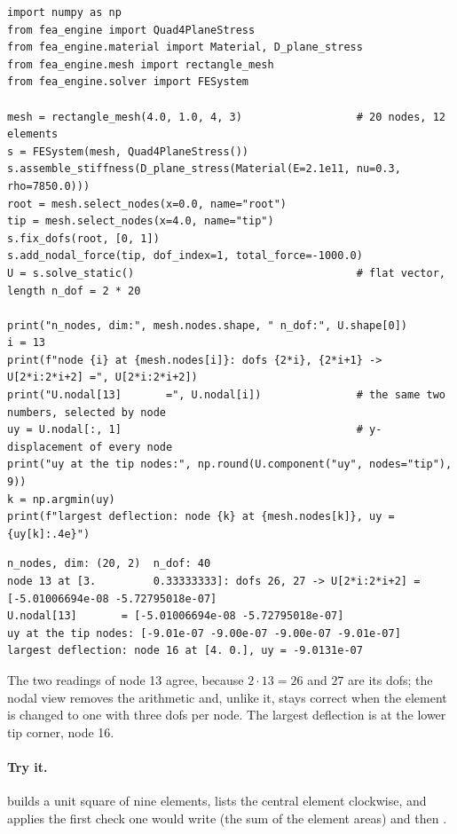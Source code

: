 \begin{lstlisting}[caption={Reading a solution per node (run with the package on the path).},label={lst:me-nodal}]
import numpy as np
from fea_engine import Quad4PlaneStress
from fea_engine.material import Material, D_plane_stress
from fea_engine.mesh import rectangle_mesh
from fea_engine.solver import FESystem

mesh = rectangle_mesh(4.0, 1.0, 4, 3)                  # 20 nodes, 12 elements
s = FESystem(mesh, Quad4PlaneStress())
s.assemble_stiffness(D_plane_stress(Material(E=2.1e11, nu=0.3, rho=7850.0)))
root = mesh.select_nodes(x=0.0, name="root")
tip = mesh.select_nodes(x=4.0, name="tip")
s.fix_dofs(root, [0, 1])
s.add_nodal_force(tip, dof_index=1, total_force=-1000.0)
U = s.solve_static()                                   # flat vector, length n_dof = 2 * 20

print("n_nodes, dim:", mesh.nodes.shape, " n_dof:", U.shape[0])
i = 13
print(f"node {i} at {mesh.nodes[i]}: dofs {2*i}, {2*i+1} -> U[2*i:2*i+2] =", U[2*i:2*i+2])
print("U.nodal[13]       =", U.nodal[i])               # the same two numbers, selected by node
uy = U.nodal[:, 1]                                     # y-displacement of every node
print("uy at the tip nodes:", np.round(U.component("uy", nodes="tip"), 9))
k = np.argmin(uy)
print(f"largest deflection: node {k} at {mesh.nodes[k]}, uy = {uy[k]:.4e}")
\end{lstlisting}

\begin{lstlisting}[numbers=none,language={},keywordstyle={},commentstyle={},frame=single,aboveskip=2pt]
n_nodes, dim: (20, 2)  n_dof: 40
node 13 at [3.         0.33333333]: dofs 26, 27 -> U[2*i:2*i+2] = [-5.01006694e-08 -5.72795018e-07]
U.nodal[13]       = [-5.01006694e-08 -5.72795018e-07]
uy at the tip nodes: [-9.01e-07 -9.00e-07 -9.00e-07 -9.01e-07]
largest deflection: node 16 at [4. 0.], uy = -9.0131e-07
\end{lstlisting}

The two readings of node 13 agree, because $2\cdot13=26$ and $27$ are its dofs; the nodal view removes the arithmetic and, unlike it, stays correct when the element is changed to one with three dofs per node. The largest deflection is at the lower tip corner, node 16.

\paragraph{Try it.}  builds a unit square of nine elements, lists the central element clockwise, and applies the first check one would write (the sum of the element areas) and then .

